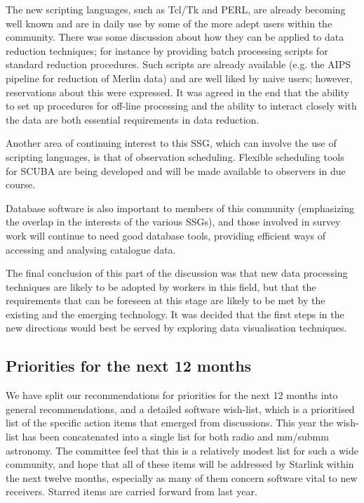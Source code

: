 The new scripting languages, such as Tcl/Tk and PERL, are already
becoming well known and are in daily use by some of the more adept
users within the community. There was some discussion about how they
can be applied to data reduction techniques; for instance by providing
batch processing scripts for standard reduction procedures. Such
scripts are already available (e.g. the AIPS pipeline for reduction of
Merlin data) and are well liked by naive users; however, reservations
about this were expressed.  It was agreed in the end that the ability
to set up procedures for off-line processing and the ability to
interact closely with the data are both essential requirements in data
reduction.

Another area of continuing interest to this SSG, which can involve the
use of scripting languages, is that of observation
scheduling. Flexible scheduling tools for SCUBA are being developed
and will be made available to observers in due course.

Database software is also important to members of this community
(emphasizing the overlap in the interests of the various SSGs), and
those involved in survey work will continue to need good database
tools, providing efficient ways of accessing and analysing catalogue
data.

The final conclusion of this part of the discussion was that new data
processing techniques are likely to be adopted by workers in this
field, but that the requirements that can be foreseen at this stage
are likely to be met by the existing and the emerging technology.  It
was decided that the first steps in the new directions would best be
served by exploring data visualisation techniques.

\subsection{Priorities for the next 12 months}

We have split our recommendations for priorities for the next 12
months into general recommendations, and a detailed software
wish-list, which is a prioritised list of the specific action items
that emerged from discussions.  This year the wish-list has been
concatenated into a single list for both radio and mm/submm
astronomy. The committee feel that this is a relatively modest list
for such a wide community, and hope that all of these items will be
addressed by Starlink within the next twelve months, especially as
many of them concern software vital to new receivers. Starred items
are carried forward from last year.

